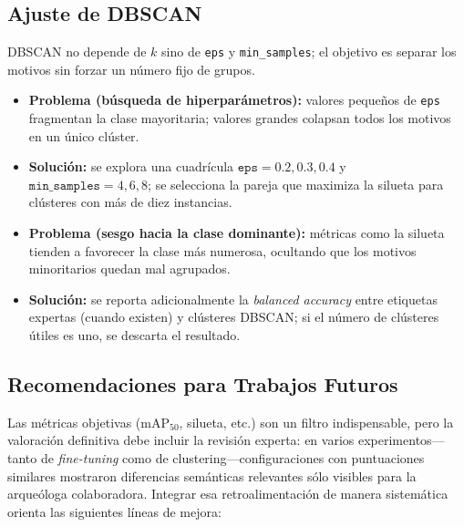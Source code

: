\subsection{Ajuste de DBSCAN}\label{ssec:dbscan}

DBSCAN no depende de \(k\) sino de \texttt{eps} y \texttt{min\_samples}; el objetivo es separar los motivos sin forzar un número fijo de grupos.

\begin{itemize}
  \item \textbf{Problema (búsqueda de hiperparámetros):} valores pequeños de \texttt{eps} fragmentan la clase mayoritaria; valores grandes colapsan todos los motivos en un único clúster.
  \item \textbf{Solución:} se explora una cuadrícula \(\texttt{eps}=0.2,0.3,0.4\) y \(\texttt{min\_samples}=4,6,8\); se selecciona la pareja que maximiza la silueta para clústeres con más de diez instancias.

  \item \textbf{Problema (sesgo hacia la clase dominante):} métricas como la silueta tienden a favorecer la clase más numerosa, ocultando que los motivos minoritarios quedan mal agrupados.
  \item \textbf{Solución:} se reporta adicionalmente la \emph{balanced accuracy} entre etiquetas expertas (cuando existen) y clústeres DBSCAN; si el número de clústeres útiles es uno, se descarta el resultado.
\end{itemize}

\subsection{Recomendaciones para Trabajos Futuros}

Las métricas objetivas (\(\text{mAP}_{50}\), silueta, etc.) son un filtro indispensable, pero la valoración definitiva debe incluir la revisión experta: en varios experimentos—tanto de \emph{fine-tuning} como de clustering—configuraciones con puntuaciones similares mostraron diferencias semánticas relevantes sólo visibles para la arqueóloga colaboradora.
Integrar esa retroalimentación de manera sistemática orienta las siguientes líneas de mejora:


